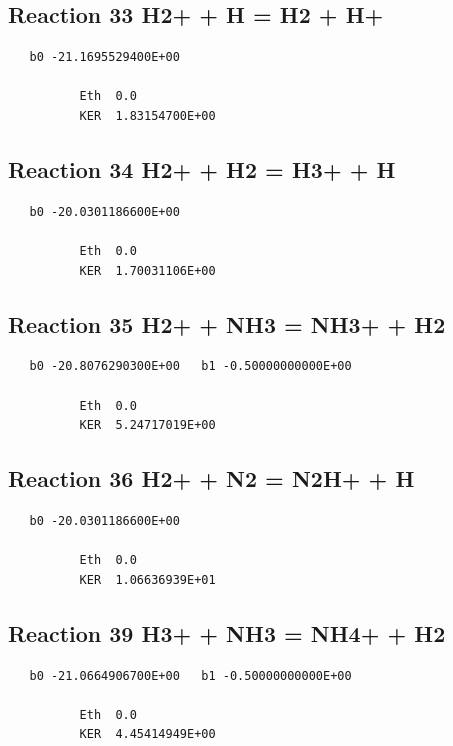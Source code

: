 \documentclass[12pt]{article}
\begin{document}
\subsection{
Reaction 33 H2+ + H = H2 + H+ }
\begin{small}\begin{verbatim}
   b0 -21.1695529400E+00

          Eth  0.0
          KER  1.83154700E+00

\end{verbatim}\end{small}
\newpage

\subsection{
Reaction 34 H2+ + H2 = H3+ + H }
\begin{small}\begin{verbatim}
   b0 -20.0301186600E+00

          Eth  0.0
          KER  1.70031106E+00

\end{verbatim}\end{small}
\newpage

\subsection{
Reaction 35 H2+ + NH3 = NH3+ + H2 }
\begin{small}\begin{verbatim}
   b0 -20.8076290300E+00   b1 -0.50000000000E+00

          Eth  0.0
          KER  5.24717019E+00

\end{verbatim}\end{small}
\newpage

\subsection{
Reaction 36 H2+ + N2 = N2H+ + H }
\begin{small}\begin{verbatim}
   b0 -20.0301186600E+00

          Eth  0.0
          KER  1.06636939E+01

\end{verbatim}\end{small}
\newpage

\subsection{
Reaction 39 H3+ + NH3 = NH4+ + H2 }
\begin{small}\begin{verbatim}
   b0 -21.0664906700E+00   b1 -0.50000000000E+00

          Eth  0.0
          KER  4.45414949E+00

\end{verbatim}\end{small}
\newpage
\end{document}
